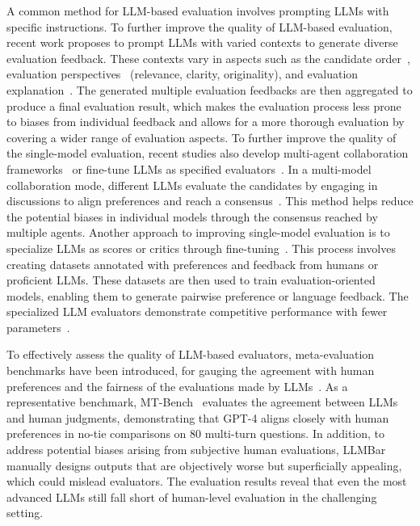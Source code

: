 {{ 
{
{A common method for LLM-based evaluation involves prompting LLMs with specific instructions.
To further improve the quality of LLM-based evaluation, recent work proposes to prompt LLMs with varied contexts to generate diverse evaluation feedback. 
These contexts vary in aspects such as the candidate order~\cite{Zheng-2023-arxiv-Judging,Wang-2023-arxiv-Large}, evaluation perspectives~\cite{Saha-23-arxiv-Branch,Zhang-23-arxiv-Wider} (\eg relevance, clarity, originality), and evaluation explanation~\cite{Wang-2023-arxiv-Large}.
The generated multiple evaluation feedbacks are then aggregated to produce a final evaluation result, which makes the evaluation process less prone to biases from individual feedback and allows for a more thorough evaluation by covering a wider range of evaluation aspects.}
To further improve the quality of the single-model evaluation, recent studies also develop multi-agent collaboration frameworks~\cite{Chan-23-arxiv-ChatEval,Li-23-arxiv-PRD,Zhang-23-arxiv-Wider} or fine-tune LLMs as specified evaluators~\cite{Bai-arXiv-2022-Constitutional,Lee-23-arxiv-RLAIF,Wang-23-arxiv-Shepherd,Cui-23-arxiv-UltraFeedback,Zhu-23-arxiv-Judge}.
In a multi-model collaboration mode, different LLMs evaluate the  candidates by engaging in discussions to align preferences and reach a consensus~\cite{Chan-23-arxiv-ChatEval,Li-23-arxiv-PRD}.
This method helps reduce the potential biases in individual models through the consensus reached by multiple agents.
Another approach to improving single-model evaluation is to specialize LLMs as scores or critics through fine-tuning~\cite{Bai-arXiv-2022-Constitutional,Lee-23-arxiv-RLAIF,Wang-23-arxiv-Shepherd,Cui-23-arxiv-UltraFeedback,Zhu-23-arxiv-Judge}.
 This process involves creating datasets annotated with preferences and feedback from humans or proficient LLMs. These datasets are then used to train evaluation-oriented  models, enabling them to generate pairwise preference or language  feedback.
The specialized LLM evaluators demonstrate competitive performance with fewer parameters~\cite{Wang-23-arxiv-Shepherd,Cui-23-arxiv-UltraFeedback,Zhu-23-arxiv-Judge}.
}

{
To effectively assess the quality of LLM-based evaluators, meta-evaluation benchmarks have been introduced, for gauging the agreement with human preferences and the fairness of the    evaluations made by LLMs~\cite{Zheng-2023-arxiv-Judging,Wang-2023-arxiv-Large,Zeng-23-arxiv-Evaluating,Zhang-23-arxiv-Wider,Koo-23-arxiv-Benchmarking}.
As a representative benchmark, MT-Bench~\cite{Zheng-2023-arxiv-Judging} evaluates the agreement between LLMs and human judgments, demonstrating that GPT-4 aligns closely with human preferences in no-tie comparisons on 80 multi-turn questions.
In addition, to address potential biases arising from subjective human evaluations, LLMBar~\cite{Zeng-23-arxiv-Evaluating} manually designs outputs that are objectively worse but superficially appealing, which could mislead evaluators.
The evaluation results reveal that even the most advanced LLMs still fall short of human-level evaluation in the challenging setting.
}

}}
